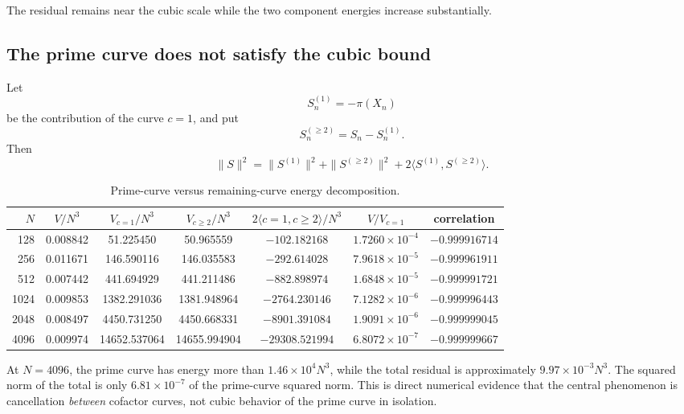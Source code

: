 \documentclass[11pt]{article}
\theoremstyle{definition}
\newcommand{\1}{\mathbf{1}}
\begin{document}
The residual remains near the cubic scale while the two component energies increase substantially.

\subsection{The prime curve does not satisfy the cubic bound}

Let
\[
 S_n^{(1)}=-\pi(X_n)
\]
be the contribution of the curve $c=1$, and put
\[
 S_n^{(\ge2)}=S_n-S_n^{(1)}.
\]
Then
\begin{equation}
 \|S\|^2
 =
 \|S^{(1)}\|^2
 +
 \|S^{(\ge2)}\|^2
 +
 2\langle S^{(1)},S^{(\ge2)}\rangle.
 \label{eq:prime-rest-energy}
\end{equation}

\begin{table}[htbp]
\centering
\caption{Prime-curve versus remaining-curve energy decomposition.}
\label{tab:prime-curve-decomposition}
\scriptsize
\setlength{\tabcolsep}{3.2pt}
\begin{tabular}{rcccccc}
\toprule
$N$ &
$V/N^3$ &
$V_{c=1}/N^3$ &
$V_{c\ge2}/N^3$ &
$2\langle c=1,c\ge2\rangle/N^3$ &
$V/V_{c=1}$ &
correlation\\
\midrule
128  & 0.008842 & 51.225450 & 50.965559 & $-102.182168$ & $1.7260\!\times10^{-4}$ & $-0.999916714$\\
256  & 0.011671 & 146.590116 & 146.035583 & $-292.614028$ & $7.9618\!\times10^{-5}$ & $-0.999961911$\\
512  & 0.007442 & 441.694929 & 441.211486 & $-882.898974$ & $1.6848\!\times10^{-5}$ & $-0.999991721$\\
1024 & 0.009853 & 1382.291036 & 1381.948964 & $-2764.230146$ & $7.1282\!\times10^{-6}$ & $-0.999996443$\\
2048 & 0.008497 & 4450.731250 & 4450.668331 & $-8901.391084$ & $1.9091\!\times10^{-6}$ & $-0.999999045$\\
4096 & 0.009974 & 14652.537064 & 14655.994904 & $-29308.521994$ & $6.8072\!\times10^{-7}$ & $-0.999999667$\\
\bottomrule
\end{tabular}
\end{table}

At $N=4096$, the prime curve has energy more than $1.46\times10^4N^3$, while the total residual is approximately $9.97\times10^{-3}N^3$.  The squared norm of the total is only $6.81\times10^{-7}$ of the prime-curve squared norm.  This is direct numerical evidence that the central phenomenon is cancellation \emph{between} cofactor curves, not cubic behavior of the prime curve in isolation.
\end{document}
